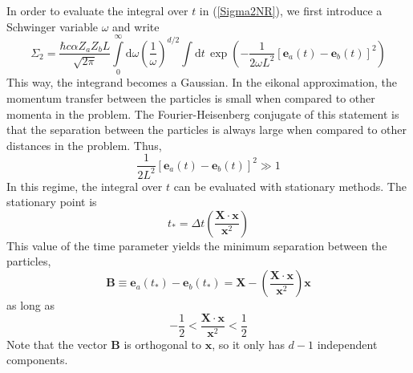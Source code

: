 In order to evaluate the integral over $t$ in (\ref{Sigma2NR}), we first introduce a Schwinger variable $\omega$ and write
\begin{equation}
	\Sigma_{2} = \frac{\hbar c \alpha Z_{a} Z_{b} L}{\sqrt{2 \pi}} \int\limits_{0}^{\infty}\mathrm{d}\omega \left( \frac{1}{\omega} \right)^{d/2} \int \mathrm{d}t \, \exp{\left( - \frac{1}{2 \omega L^{2}} [\mathbf{e}_{a}(t) - \mathbf{e}_{b}(t)]^{2} \right)}
\end{equation}
This way, the integrand becomes a Gaussian. In the eikonal approximation, the momentum transfer between the particles is small when compared to other momenta in the problem. The Fourier-Heisenberg conjugate of this statement is that the separation between the particles is always large when compared to other distances in the problem. Thus,
\begin{equation}
	\frac{1}{2 L^{2}} [\mathbf{e}_{a}(t) - \mathbf{e}_{b}(t)]^{2} \gg 1
\end{equation}
In this regime, the integral over $t$ can be evaluated with stationary methods. The stationary point is
\begin{equation}
	t_{*} = \Delta t \left( \frac{\mathbf{X} \cdot \mathbf{x}}{\mathbf{x}^{2}} \right)
\end{equation}
This value of the time parameter yields the minimum separation between the particles,
\begin{equation}
	\mathbf{B} \equiv \mathbf{e}_{a}(t_{*}) - \mathbf{e}_{b}(t_{*}) = \mathbf{X} - \left( \frac{\mathbf{X} \cdot \mathbf{x}}{\mathbf{x}^{2}} \right) \mathbf{x}
\end{equation}
as long as
\begin{equation}
	{- \frac{1}{2}} < \frac{\mathbf{X} \cdot \mathbf{x}}{\mathbf{x}^{2}} < \frac{1}{2}
\end{equation}
Note that the vector $\mathbf{B}$ is orthogonal to $\mathbf{x}$, so it only has $d - 1$ independent components.

